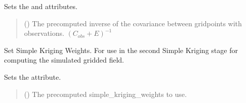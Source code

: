 \documentclass[letterpaper,10pt,english]{sphinxmanual}
\begin{document}
\begin{fulllineitems}
\begin{fulllineitems}
\sphinxAtStartPar
Sets the  and  attributes.
\begin{quote}\begin{description}
\sphinxAtStartPar
{} () \textendash{} The pre\sphinxhyphen{}computed inverse of the covariance between grid\sphinxhyphen{}points with
observations. \((C_{obs} + E)^{-1}\)

\sphinxAtStartPar
{}

\end{description}\end{quote}

\end{fulllineitems}


\begin{fulllineitems}
\label{\detokenize{kriging:glomar_gridding.stochastic.StochasticKriging.set_simple_kriging_weights}}
\pysigstartsignatures
\pysiglinewithargsret
{}
{}
{}
\pysigstopsignatures
\sphinxAtStartPar
Set Simple Kriging Weights. For use in the second Simple Kriging stage
for computing the simulated gridded field.

\sphinxAtStartPar
Sets the  attribute.
\begin{quote}\begin{description}
\sphinxAtStartPar
{} () \textendash{} The pre\sphinxhyphen{}computed simple\_kriging\_weights to use.

\sphinxAtStartPar
{}

\end{description}\end{quote}

\end{fulllineitems}


\end{fulllineitems}
\end{document}
